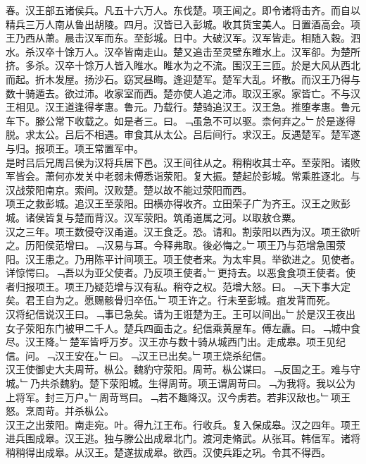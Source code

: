 \documentclass{zhvt-classic}
\begin{document}
\hspace*{2em}春。汉王部五诸侯兵。凡五十六万人。东伐楚。项王闻之。即令诸将击齐。而自以精兵三万人南从鲁出胡陵。四月。汉皆已入彭城。收其货宝美人。日置酒高会。项王乃西从萧。晨击汉军而东。至彭城。日中。大破汉军。汉军皆走。相随入穀。泗水。杀汉卒十馀万人。汉卒皆南走山。楚又追击至灵壁东睢水上。汉军卻。为楚所挤。多杀。汉卒十馀万人皆入睢水。睢水为之不流。围汉王三匝。於是大风从西北而起。折木发屋。扬沙石。窈冥昼晦。逢迎楚军。楚军大乱。坏散。而汉王乃得与数十骑遁去。欲过沛。收家室而西。楚亦使人追之沛。取汉王家。家皆亡。不与汉王相见。汉王道逢得孝惠。鲁元。乃载行。楚骑追汉王。汉王急。推堕孝惠。鲁元车下。滕公常下收载之。如是者三。曰。﹁虽急不可以驱。柰何弃之。﹂於是遂得脱。求太公。吕后不相遇。审食其从太公。吕后间行。求汉王。反遇楚军。楚军遂与归。报项王。项王常置军中。\\
\hspace*{2em}是时吕后兄周吕侯为汉将兵居下邑。汉王间往从之。稍稍收其士卒。至荥阳。诸败军皆会。萧何亦发关中老弱未傅悉诣荥阳。复大振。楚起於彭城。常乘胜逐北。与汉战荥阳南京。索间。汉败楚。楚以故不能过荥阳而西。\\
\hspace*{2em}项王之救彭城。追汉王至荥阳。田横亦得收齐。立田荣子广为齐王。汉王之败彭城。诸侯皆复与楚而背汉。汉军荥阳。筑甬道属之河。以取敖仓粟。\\
\hspace*{2em}汉之三年。项王数侵夺汉甬道。汉王食乏。恐。请和。割荥阳以西为汉。项王欲听之。历阳侯范增曰。﹁汉易与耳。今释弗取。後必悔之。﹂项王乃与范增急围荥阳。汉王患之。乃用陈平计间项王。项王使者来。为太牢具。举欲进之。见使者。详惊愕曰。﹁吾以为亚父使者。乃反项王使者。﹂更持去。以恶食食项王使者。使者归报项王。项王乃疑范增与汉有私。稍夺之权。范增大怒。曰。﹁天下事大定矣。君王自为之。愿赐骸骨归卒伍。﹂项王许之。行未至彭城。疽发背而死。\\
\hspace*{2em}汉将纪信说汉王曰。﹁事已急矣。请为王诳楚为王。王可以间出。﹂於是汉王夜出女子荥阳东门被甲二千人。楚兵四面击之。纪信乘黄屋车。傅左纛。曰。﹁城中食尽。汉王降。﹂楚军皆呼万岁。汉王亦与数十骑从城西门出。走成皋。项王见纪信。问。﹁汉王安在。﹂曰。﹁汉王已出矣。﹂项王烧杀纪信。\\
\hspace*{2em}汉王使御史大夫周苛。枞公。魏豹守荥阳。周苛。枞公谋曰。﹁反国之王。难与守城。﹂乃共杀魏豹。楚下荥阳城。生得周苛。项王谓周苛曰。﹁为我将。我以公为上将军。封三万户。﹂周苛骂曰。﹁若不趣降汉。汉今虏若。若非汉敌也。﹂项王怒。烹周苛。并杀枞公。\\
\hspace*{2em}汉王之出荥阳。南走宛。叶。得九江王布。行收兵。复入保成皋。汉之四年。项王进兵围成皋。汉王逃。独与滕公出成皋北门。渡河走脩武。从张耳。韩信军。诸将稍稍得出成皋。从汉王。楚遂拔成皋。欲西。汉使兵距之巩。令其不得西。\\
\end{document}
